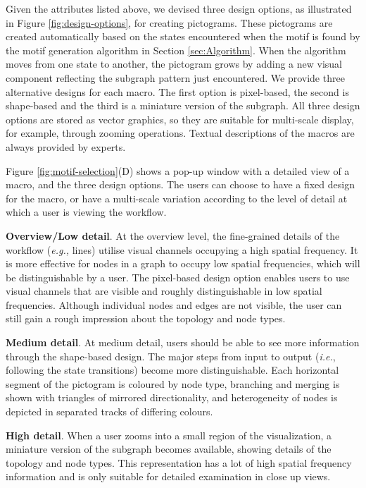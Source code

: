\vspace{-1mm}
Given the attributes listed above, we devised three design options, as illustrated in Figure \ref{fig:design-options}, for creating pictograms.
These pictograms are created automatically based on the states encountered when the motif is found by the motif generation algorithm in Section \ref{sec:Algorithm}.
When the algorithm moves from one state to another, the pictogram grows by adding a new visual component reflecting the subgraph pattern just encountered.
We provide three alternative designs for each macro.
The first option is pixel-based, the second is shape-based and the third is a miniature version of the subgraph.
All three design options are stored as vector graphics, so they are suitable for multi-scale display, for example, through zooming operations.
Textual descriptions of the macros are always provided by experts.


Figure \ref{fig:motif-selection}(D) shows a pop-up window with a detailed view of a macro, and the three design options.
The users can choose to have a fixed design for the macro, or have a multi-scale variation according to the level of detail at which a user is viewing the workflow.

\noindent\textbf{Overview/Low detail}. At the overview level, the fine-grained details of the workflow (\emph{e.g.,} lines) utilise visual channels occupying a high spatial frequency.
It is more effective for nodes in a graph to occupy low spatial frequencies, which will be distinguishable by a user.
The pixel-based design option enables users to use visual channels that are visible and roughly distinguishable in low spatial frequencies.
Although individual nodes and edges are not visible, the user can still gain a rough impression about the topology and node types. 

\noindent\textbf{Medium detail}. At medium detail, users should be able to see more information through the shape-based design.
The major steps from input to output (\emph{i.e.}, following the state transitions) become more distinguishable.
Each horizontal segment of the pictogram is coloured by node type, branching and merging is shown with triangles of mirrored directionality, and heterogeneity of nodes is depicted in separated tracks of differing colours. 

\noindent \textbf{High detail}. When a user zooms into a small region of the visualization, a miniature version of the subgraph becomes available, showing details of the topology and node types. This representation has a lot of high spatial frequency information and is only suitable for detailed examination in close up views.

